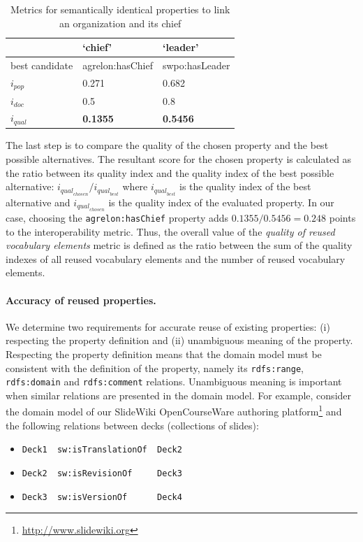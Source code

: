 \begin{table}[!htb]
\centering
\begin{tabulary}{\columnwidth}{L|L|L}

\toprule
& \textbf{`chief'} & \textbf{`leader'}  \\
\midrule
best candidate & agrelon:hasChief & swpo:hasLeader  \\
\textbf{$i_\mathit{pop}$} & 0.271 & 0.682  \\
\textbf{$i_\mathit{doc}$} & 0.5 & 0.8 \\
\textbf{$i_\mathit{qual}$} & \textbf{0.1355} & \textbf{0.5456} \\
\end{tabulary}
\caption{Metrics for semantically identical properties to link an organization and its chief}
\label{sem_identical}
\end{table}

The last step is to compare the quality of the chosen property and the best possible alternatives.
The resultant score for the chosen property is calculated as the ratio between its quality index and the quality index of the best possible alternative: $i_{\mathit{qual}_\mathit{chosen}} / i_{\mathit{qual}_\mathit{best}}$ where $i_{\mathit{qual}_\mathit{best}}$ is the quality index of the best alternative and $i_{\mathit{qual}_\mathit{chosen}}$ is the quality index of the evaluated property.
In our case, choosing the \texttt{agrelon:hasChief} property adds $0.1355/0.5456 = 0.248$ points to the interoperability metric.
Thus, the overall value of the \emph{quality of reused vocabulary elements} metric is defined as the ratio between the sum of the quality indexes of all reused vocabulary elements and the number of reused vocabulary elements.
 
\paragraph{Accuracy of reused properties.}
We determine two requirements for accurate reuse of existing properties: 
(i) respecting the property definition and 
(ii) unambiguous meaning of the property.
Respecting the property definition means that the domain model must be consistent with the definition of the property, namely its \texttt{rdfs:range}, \texttt{rdfs:domain} and \texttt{rdfs:comment} relations.
Unambiguous meaning is important when similar relations are presented in the domain model.
For example, consider the domain model of our SlideWiki OpenCourseWare authoring platform\footnote{\url{http://www.slidewiki.org}} and the following relations between decks (collections of slides): 
\begin{itemize}
\item \verb|Deck1  sw:isTranslationOf  Deck2| 
\item \verb|Deck2  sw:isRevisionOf     Deck3|
\item \verb|Deck3  sw:isVersionOf      Deck4|
\end{itemize} 

